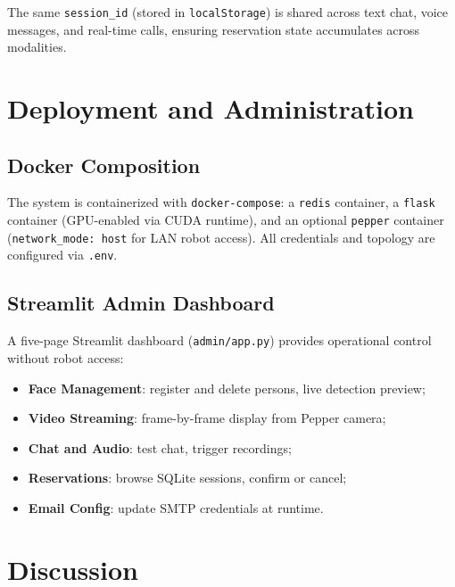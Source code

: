 \documentclass[a4paper]{article}
\begin{document}
The same \texttt{session\_id} (stored in \texttt{localStorage}) is shared across text chat, voice messages, and real-time calls, ensuring reservation state accumulates across modalities.

\section{Deployment and Administration}

\subsection{Docker Composition}

The system is containerized with \texttt{docker-compose}: a \texttt{redis} container, a \texttt{flask} container (GPU-enabled via CUDA runtime), and an optional \texttt{pepper} container (\texttt{network\_mode: host} for LAN robot access). All credentials and topology are configured via \texttt{.env}.

\subsection{Streamlit Admin Dashboard}

A five-page Streamlit dashboard (\texttt{admin/app.py}) provides operational control without robot access:
\begin{itemize}
  \item \textbf{Face Management}: register and delete persons, live detection preview;
  \item \textbf{Video Streaming}: frame-by-frame display from Pepper camera;
  \item \textbf{Chat and Audio}: test chat, trigger recordings;
  \item \textbf{Reservations}: browse SQLite sessions, confirm or cancel;
  \item \textbf{Email Config}: update SMTP credentials at runtime.
\end{itemize}

\section{Discussion}
\end{document}
